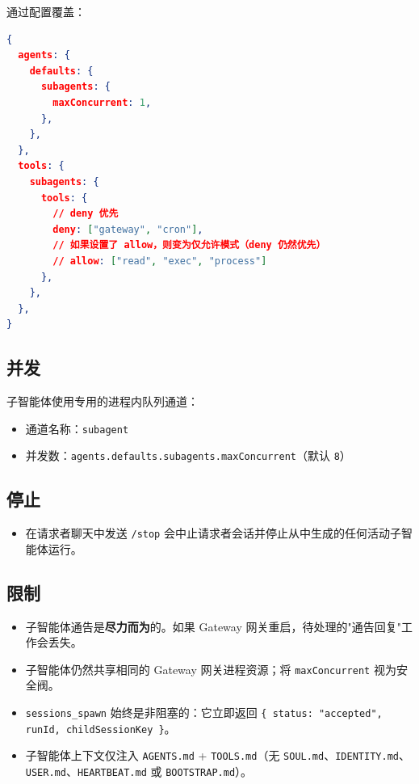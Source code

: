 通过配置覆盖：

\begin{lstlisting}[language=json]
{
  agents: {
    defaults: {
      subagents: {
        maxConcurrent: 1,
      },
    },
  },
  tools: {
    subagents: {
      tools: {
        // deny 优先
        deny: ["gateway", "cron"],
        // 如果设置了 allow，则变为仅允许模式（deny 仍然优先）
        // allow: ["read", "exec", "process"]
      },
    },
  },
}
\end{lstlisting}


\subsection{并发}


子智能体使用专用的进程内队列通道：

\begin{itemize}
  \item 通道名称：\texttt{subagent}
  \item 并发数：\texttt{agents.defaults.subagents.maxConcurrent}（默认 \texttt{8}）
\end{itemize}


\subsection{停止}


\begin{itemize}
  \item 在请求者聊天中发送 \texttt{/stop} 会中止请求者会话并停止从中生成的任何活动子智能体运行。
\end{itemize}


\subsection{限制}


\begin{itemize}
  \item 子智能体通告是\textbf{尽力而为}的。如果 Gateway 网关重启，待处理的"通告回复"工作会丢失。
  \item 子智能体仍然共享相同的 Gateway 网关进程资源；将 \texttt{maxConcurrent} 视为安全阀。
  \item \texttt{sessions\_spawn} 始终是非阻塞的：它立即返回 \texttt{\{ status: "accepted", runId, childSessionKey \}}。
  \item 子智能体上下文仅注入 \texttt{AGENTS.md} + \texttt{TOOLS.md}（无 \texttt{SOUL.md}、\texttt{IDENTITY.md}、\texttt{USER.md}、\texttt{HEARTBEAT.md} 或 \texttt{BOOTSTRAP.md}）。
\end{itemize}



